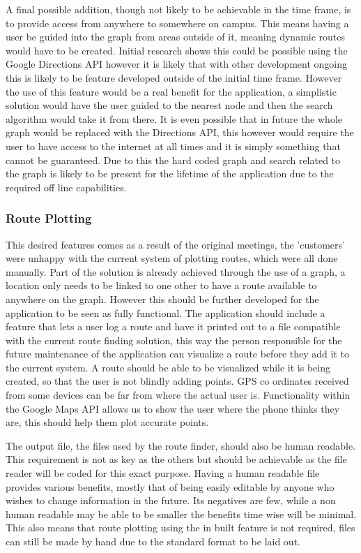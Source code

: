 A final possible addition, though not likely to be achievable in the time frame, is to provide access from anywhere to somewhere on campus. This means having a user be guided into the graph from areas outside of it, meaning dynamic routes would have to be created. Initial research shows this could be possible using the Google Directions API however it is likely that with other development ongoing this is likely to be feature developed outside of the initial time frame. However the use of this feature would be a real benefit for the application, a simplistic solution would have the user guided to the nearest node and then the search algorithm would take it from there. It is even possible that in future the whole graph would be replaced with the Directions API, this however would require the user to have access to the internet at all times and it is simply something that cannot be guaranteed. Due to this the hard coded graph and search related to the graph is likely to be present for the lifetime of the application due to the required off line capabilities. 
\subsubsection{Route Plotting}
This desired features comes as a result of the original meetings, the 'customers' were unhappy with the current system of plotting routes, which were all done manually.  Part of the solution is already achieved through the use of a graph, a location only needs to be linked to one other to have a route available to anywhere on the graph. However this should be further developed for the application to be seen as fully functional. The application should include a feature that lets a user log a route and have it printed out to a file compatible with the current route finding solution, this way the person responsible for the future maintenance of the application can visualize a route before they add it to the current system. A route should be able to be visualized while it is being created, so that the user is not blindly adding points. GPS co ordinates received from some devices can be far from where the actual user is. Functionality within the Google Maps API allows us to show the user where the phone thinks they are, this should help them plot accurate points. 

The output file, the files used by the route finder, should also be human readable. This requirement is not as key as the others but should be achievable as the file reader will be coded for this exact purpose. Having a human readable file provides various benefits, mostly that of being easily editable by anyone who wishes to change information in the future. Its negatives are few, while a non human readable may be able to be smaller the benefits time wise will be minimal. This also means that route plotting using the in built feature is not required, files can still be made by hand due to the standard format to be laid out. 

